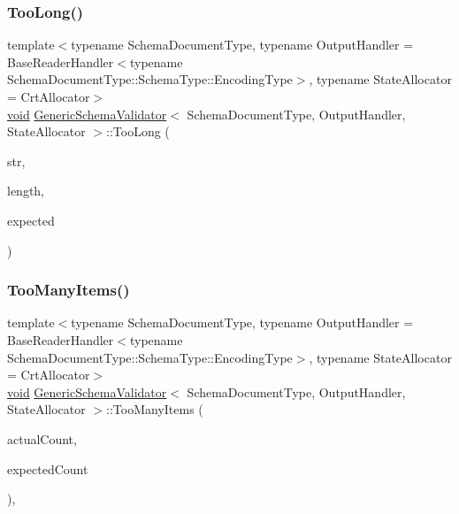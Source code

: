 \subsubsection{\texorpdfstring{Too\+Long()}{TooLong()}}
{\footnotesize\ttfamily template$<$typename Schema\+Document\+Type, typename Output\+Handler = Base\+Reader\+Handler$<$typename Schema\+Document\+Type\+::\+Schema\+Type\+::\+Encoding\+Type$>$, typename State\+Allocator = Crt\+Allocator$>$ \\
\hyperlink{imgui__impl__opengl3__loader_8h_ac668e7cffd9e2e9cfee428b9b2f34fa7}{void} \hyperlink{classGenericSchemaValidator}{Generic\+Schema\+Validator}$<$ Schema\+Document\+Type, Output\+Handler, State\+Allocator $>$\+::Too\+Long (\begin{DoxyParamCaption}\item[{const \hyperlink{classGenericSchemaValidator_a8b7dab5a0cda9cc0adaefb4401d260c1}{Ch} $\ast$}]{str,  }\item[{\hyperlink{rapidjson_8h_a5ed6e6e67250fadbd041127e6386dcb5}{Size\+Type}}]{length,  }\item[{\hyperlink{rapidjson_8h_a5ed6e6e67250fadbd041127e6386dcb5}{Size\+Type}}]{expected }\end{DoxyParamCaption})\hspace{0.3cm}{\ttfamily [inline]}}

\mbox{\label{classGenericSchemaValidator_a78e85eeae0e2bdef827815672a7fbbc9}} 
\subsubsection{\texorpdfstring{Too\+Many\+Items()}{TooManyItems()}}
{\footnotesize\ttfamily template$<$typename Schema\+Document\+Type, typename Output\+Handler = Base\+Reader\+Handler$<$typename Schema\+Document\+Type\+::\+Schema\+Type\+::\+Encoding\+Type$>$, typename State\+Allocator = Crt\+Allocator$>$ \\
\hyperlink{imgui__impl__opengl3__loader_8h_ac668e7cffd9e2e9cfee428b9b2f34fa7}{void} \hyperlink{classGenericSchemaValidator}{Generic\+Schema\+Validator}$<$ Schema\+Document\+Type, Output\+Handler, State\+Allocator $>$\+::Too\+Many\+Items (\begin{DoxyParamCaption}\item[{\hyperlink{rapidjson_8h_a5ed6e6e67250fadbd041127e6386dcb5}{Size\+Type}}]{actual\+Count,  }\item[{\hyperlink{rapidjson_8h_a5ed6e6e67250fadbd041127e6386dcb5}{Size\+Type}}]{expected\+Count }\end{DoxyParamCaption})\hspace{0.3cm}{\ttfamily [inline]}, {\ttfamily [virtual]}}



